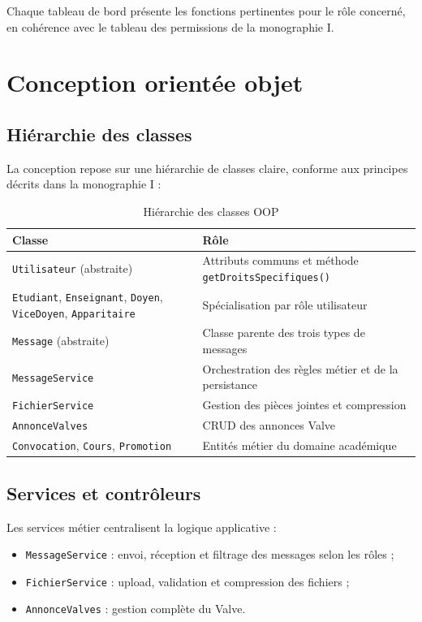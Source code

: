 \documentclass[12pt,a4paper]{article}
\begin{document}
Chaque tableau de bord présente les fonctions pertinentes pour le rôle concerné, en cohérence avec le tableau des permissions de la monographie I.

\section{Conception orientée objet}

\subsection{Hiérarchie des classes}

La conception repose sur une hiérarchie de classes claire, conforme aux principes décrits dans la monographie I :

\begin{table}[h]
\centering
\small
\begin{tabular}{|l|p{9cm}|}
\hline
\textbf{Classe} & \textbf{Rôle} \\
\hline
\texttt{Utilisateur} (abstraite) & Attributs communs et méthode \texttt{getDroitsSpecifiques()} \\
\hline
\texttt{Etudiant}, \texttt{Enseignant}, \texttt{Doyen}, \texttt{ViceDoyen}, \texttt{Apparitaire} & Spécialisation par rôle utilisateur \\
\hline
\texttt{Message} (abstraite) & Classe parente des trois types de messages \\
\hline
\texttt{MessageService} & Orchestration des règles métier et de la persistance \\
\hline
\texttt{FichierService} & Gestion des pièces jointes et compression \\
\hline
\texttt{AnnonceValves} & CRUD des annonces Valve \\
\hline
\texttt{Convocation}, \texttt{Cours}, \texttt{Promotion} & Entités métier du domaine académique \\
\hline
\end{tabular}
\caption{Hiérarchie des classes OOP}
\end{table}

\subsection{Services et contrôleurs}

Les services métier centralisent la logique applicative :
\begin{itemize}
  \item \texttt{MessageService} : envoi, réception et filtrage des messages selon les rôles ;
  \item \texttt{FichierService} : upload, validation et compression des fichiers ;
  \item \texttt{AnnonceValves} : gestion complète du Valve.
\end{itemize}
\end{document}
